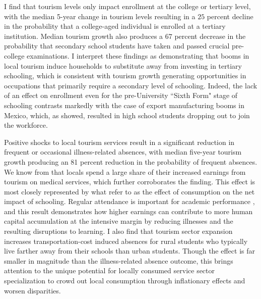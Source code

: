 \documentclass[12pt]{article}
\begin{document}
	I find that tourism levels only impact enrollment at the college or tertiary level, with the median 5-year change in tourism levels resulting in a $25$ percent decline in the probability that a college-aged individual is enrolled at a tertiary institution. Median tourism growth also produces a $67$ percent decrease in the probability that secondary school students have taken and passed crucial pre-college examinations. I interpret these findings as demonstrating that booms in local tourism induce households to substitute away from investing in tertiary schooling, which is consistent with tourism growth generating opportunities in occupations that primarily require a secondary level of schooling. Indeed, the lack of an effect on enrollment even for the pre-University ``Sixth Form" stage of schooling contrasts markedly with the case of export manufacturing booms in Mexico, which, as \textcite{ atkin_endogenous_2016} showed, resulted in high school students dropping out to join the workforce. 
	
	Positive shocks to local tourism services result in a significant reduction in frequent or occasional illness-related absences, with median five-year tourism growth producing an 81 percent reduction in the probability of frequent absences. We know from \textcite{ mcketty_sun_2026} that locals spend a large share of their increased earnings from tourism on medical services, which further corroborates the finding. This effect is most closely represented by what \textcite{ shah_drought_2017} refer to as the effect of consumption on the net impact of schooling. Regular attendance is important for academic performance \parencite{ gershenson_are_2017}, and this result demonstrates how higher earnings can contribute to more human capital accumulation at the intensive margin by reducing illnesses and the resulting disruptions to learning. I also find that tourism sector expansion increases transportation-cost induced absences for rural students who typically live farther away from their schools than urban students. Though the effect is far smaller in magnitude than the illness-related absence outcome, this brings attention to the unique potential for locally consumed service sector specialization to crowd out local consumption through inflationary effects and worsen disparities. 
	
\end{document}
